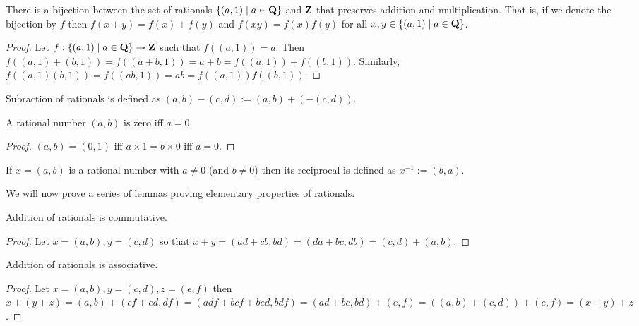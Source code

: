 \begin{lem}\label{c3s2l5}
There is a bijection between the set of rationals $\{(a, 1) \;|\; a \in 
\mathbf{Q}\}$ and $\mathbf{Z}$ that preserves addition and multiplication. That is, if
we denote the bijection by $f$ then $f(x + y) = f(x) + f(y)$ and $f(xy)
= f(x)f(y)$ for all $x, y \in \{(a, 1) \;|\; a \in \mathbf{Q}\}$.
\end{lem}
\begin{proof}
Let $f: \{(a, 1) \;|\; a \in \mathbf{Q}\} \rightarrow \mathbf{Z}$ such that $f((a, 1))
= a$. Then $f((a, 1) + (b, 1)) = f((a + b, 1)) = a + b = f((a, 1)) + f((b,
1))$. Similarly, $f((a, 1)(b, 1)) = f((ab, 1)) = ab = f((a, 1))f((b, 1))$.
\end{proof}

\begin{defn}\label{c3s2d5}
Subraction of rationals is defined as $(a, b) - (c, d) := (a, b) + 
(-(c, d))$.
\end{defn}

\begin{lem}\label{c3s2l6}
A rational number $(a, b)$ is zero iff $a = 0$.
\end{lem}
\begin{proof}
$(a, b) = (0, 1)$ iff $a \times 1 = b \times 0$ iff $a = 0$.
\end{proof}

\begin{defn}\label{c3s2d6}
If $x = (a, b)$ is a rational number with $a \ne 0$ (and $b \ne 0$) then
its reciprocal is defined as $x^{-1} := (b, a)$.
\end{defn}

We will now prove a series of lemmas proving elementary properties of
rationals.
\begin{lem}\label{c3s2l7}
Addition of rationals is commutative.
\end{lem}
\begin{proof}
Let $x = (a, b), y = (c, d)$ so that $x + y = (ad + cb, bd) = (da + bc, db)
= (c, d) + (a, b)$.
\end{proof}

\begin{lem}\label{c3s2l8}
Addition of rationals is associative.
\end{lem}
\begin{proof}
Let $x = (a, b), y = (c, d), z = (e, f)$ then $x + (y + z) = (a, b) + 
(cf + ed, df) = (adf + bcf + bed, bdf) = (ad + bc, bd) + (e, f) = ((a, b)
+ (c, d)) + (e, f) = (x + y) + z$.
\end{proof}

